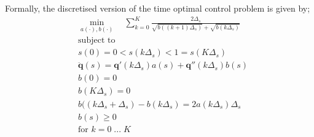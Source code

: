 Formally, the discretised version of the time optimal control problem is given by;
\begin{align*}
&\min_{a(\cdot),b(\cdot)} \quad \sum_{k=0}^{K}\frac{2\Delta_s}{\sqrt{b((k+1)\Delta_s)} + \sqrt{b(k\Delta_s)}}\\
&\text{subject to }\\
&s(0) = 0 < s(k\Delta_s) < 1 = s(K\Delta_s)\\
&\ddot{\textbf{q}}(s) = \textbf{q}'(k\Delta_s)a(s) + \textbf{q}''(k\Delta_s)b(s)\\
&b(0) = 0\\
&b(K\Delta_s) = 0\\
&b((k\Delta_s + \Delta_s) - b(k\Delta_s) = 2a(k\Delta_s)\Delta_s\\
&b(s) \geq 0\\
&\text{for }k=0\; ... \;K
\end{align*}